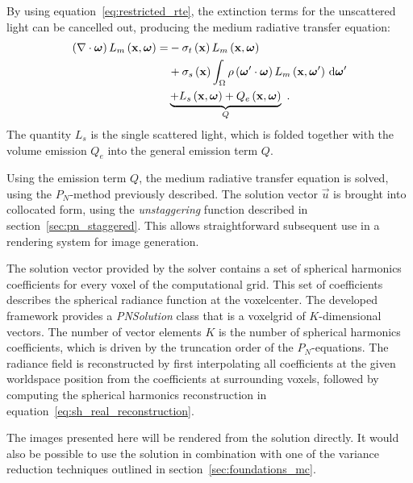 By using equation~\ref{eq:restricted_rte}, the extinction terms for the unscattered light can be cancelled out, producing the medium radiative transfer equation:
\begin{align}
\left(\nabla\cdot\boldsymbol{\mathbf{\omega}}\right)L_m\left(\boldsymbol{\mathbf{x}}, \boldsymbol{\mathbf{\omega}} \right)
=&
-\sigma_t\left(\boldsymbol{\mathbf{x}}\right) L_m\left(\boldsymbol{\mathbf{x}}, \boldsymbol{\mathbf{\omega}} \right)\nonumber\\
&
+\sigma_s\left(\boldsymbol{\mathbf{x}}\right) \int_{\Omega}
{
\rho\left(\boldsymbol{\mathbf{\omega}}'\cdot\boldsymbol{\mathbf{\omega}}\right)L_m\left(\boldsymbol{\mathbf{x}}, \boldsymbol{\mathbf{\omega}}' \right)\,\mathrm{d}\boldsymbol{\mathbf{\omega}}'
}
\nonumber
\\
&
\underbrace
{
+L_s\left(\boldsymbol{\mathbf{x}}, \boldsymbol{\mathbf{\omega}}\right)
+Q_e\left(\boldsymbol{\mathbf{x}}, \boldsymbol{\mathbf{\omega}}\right)
}_{Q}
\nonumber
\  .
\end{align}
The quantity $L_s$ is the single scattered light, which is folded together with the volume emission $Q_e$ into the general emission term $Q$.

Using the emission term $Q$, the medium radiative transfer equation is solved, using the $P_N$-method previously described. The solution vector $\vec{u}$ is brought into collocated form, using the \emph{unstaggering} function described in section~\ref{sec:pn_staggered}. This allows straightforward subsequent use in a rendering system for image generation. 

The solution vector provided by the solver contains a set of spherical harmonics coefficients for every voxel of the computational grid. This set of coefficients describes the spherical radiance function at the voxelcenter. The developed framework provides a \emph{PNSolution} class that is a voxelgrid of $K$-dimensional vectors. The number of vector elements $K$ is the number of spherical harmonics coefficients, which is driven by the truncation order of the $P_N$-equations. The radiance field is reconstructed by first interpolating all coefficients at the given worldspace position from the coefficients at surrounding voxels, followed by computing the spherical harmonics reconstruction in equation~\ref{eq:sh_real_reconstruction}.

The images presented here will be rendered from the solution directly. It would also be possible to use the solution in combination with one of the variance reduction techniques outlined in section~\ref{sec:foundations_mc}.

